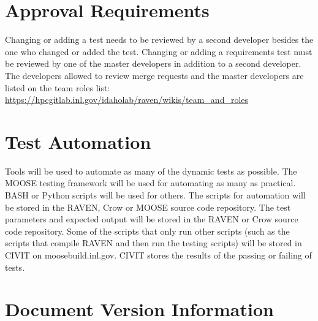 \documentclass{article}
\begin{document}
\section{Approval Requirements}

Changing or adding a test needs to be reviewed by a second developer
besides the one who changed or added the test.  Changing or adding a
requirements test must be reviewed by one of the master developers in
addition to a second developer.  The developers allowed to review
merge requests and the master developers are listed on the team roles
list:
\url{https://hpcgitlab.inl.gov/idaholab/raven/wikis/team_and_roles}



\section{Test Automation}

Tools will be used to automate as many of the dynamic tests as
possible.  The MOOSE testing framework will be used for automating as
many as practical.  BASH or Python scripts will be used for others.
The scripts for automation will be stored in the RAVEN, Crow or MOOSE
source code repository.  The test parameters and expected output will
be stored in the RAVEN or Crow source code repository. Some of the
scripts that only run other scripts (such as the scripts that compile
RAVEN and then run the testing scripts) will be stored in CIVIT on
moosebuild.inl.gov.  CIVIT stores the results of the passing or
failing of tests.

\section*{Document Version Information}


\end{document}
